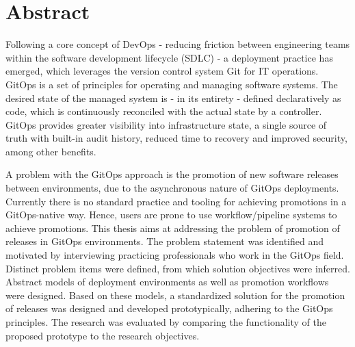 \chapter{Abstract}

%








Following a core concept of DevOps
- reducing friction between engineering teams within the software development lifecycle (SDLC) -
a deployment practice has emerged,
which leverages the version control system Git for IT operations.
GitOps is a set of principles for operating and managing software systems.
The desired state of the managed system is
- in its entirety -
defined declaratively as code,
which is continuously reconciled with the actual state by a controller.
GitOps provides greater visibility into infrastructure state,
a single source of truth with built-in audit history,
reduced time to recovery and improved security,
among other benefits.

A problem with the GitOps approach is the promotion of new software releases between environments,
due to the asynchronous nature of GitOps deployments.
Currently there is no standard practice and tooling for achieving promotions in a GitOps-native way.
Hence, users are prone to use workflow/pipeline systems to achieve promotions.
This thesis aims at addressing the problem
of promotion of releases in GitOps environments.
The problem statement was identified and motivated by
interviewing practicing professionals who work in the GitOps field.
Distinct problem items were defined, from which solution objectives were inferred.
Abstract models of deployment environments as well as promotion workflows
were designed.
Based on these models,
a standardized solution for the promotion of releases
was designed and developed prototypically,
adhering to the GitOps principles.
The research was evaluated by
comparing the functionality of the proposed prototype
to the research objectives.

